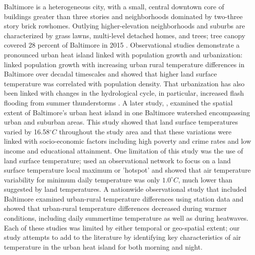 \documentclass[draft,linenumbers]{agujournal}
\begin{document}
Baltimore is a heterogeneous city, with a small, central downtown core of buildings greater than three stories and  neighborhoods dominated by two-three story brick rowhomes. Outlying higher-elevation neighborhoods and suburbs are characterized by grass lawns, multi-level detached homes, and trees; tree canopy covered 28 percent of Baltimore in 2015 \cite{grove2011urban}. 
Observational studies demonstrate a pronounced urban heat island linked with population growth and urbanization: \cite{brazel2000tale} linked population growth with increasing urban rural temperature differences in Baltimore over decadal timescales and showed that higher land surface temperature was correlated with population density. 
That urbanization has also been linked with changes in the hydrological cycle, in particular,    %
increased flash flooding from summer thunderstorms \citep{ntelekos2007climatological}.   
 A later study,
\cite{Huang20111753}, examined the spatial extent of Baltimore's urban heat island in one Baltimore watershed encompassing urban and suburban areas. This study showed that land surface temperatures varied by 16.58$^\circ C$ throughout the study area and that these variations were linked with socio-economic factors including high poverty and crime rates and low income and educational attainment. One limitation of this study was the use of land surface temperature; \cite{scott2017intraurban} used an observational network to focus on a land surface temperature local maximum or 'hotspot' and showed that air temperature variability for minimum daily temperature was only $1.0^\circ C$, much lower than suggested by land temperatures. 
A nationwide observational study that included Baltimore \citep{scott2018reduced} examined urban-rural temperature differences using station data and showed that urban-rural temperature differences decreased during warmer conditions, including daily summertime temperature as well as during heatwaves.  Each of these studies was limited by either temporal or geo-spatial extent; our study attempts to add to the literature by identifying key characteristics of air temperature in the urban heat island for both morning and night. 
\end{document}
